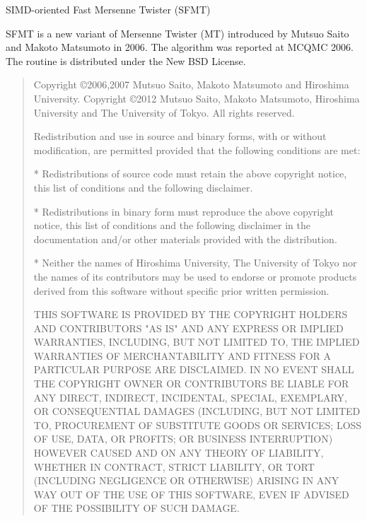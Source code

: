 \documentclass[a4paper,11pt,oneside,english]{sphinxmanual}
\begin{document}
\vspace{1ex}

{\large SIMD-oriented Fast Mersenne Twister (SFMT)}

SFMT is a new variant of Mersenne Twister (MT) introduced by Mutsuo Saito and Makoto Matsumoto in 2006. The algorithm was reported at MCQMC 2006.
The routine is distributed under the New BSD License.

\begin{quote}
  Copyright \copyright 2006,2007 Mutsuo Saito, Makoto Matsumoto and Hiroshima University.
  Copyright \copyright 2012 Mutsuo Saito, Makoto Matsumoto, Hiroshima University and The University of Tokyo.
  All rights reserved.

  Redistribution and use in source and binary forms, with or without modification, are permitted provided that the following conditions are met:

  * Redistributions of source code must retain the above copyright
  notice, this list of conditions and the following disclaimer.

  * Redistributions in binary form must reproduce the above
  copyright notice, this list of conditions and the following
  disclaimer in the documentation and/or other materials provided
  with the distribution.

  * Neither the names of Hiroshima University, The University of
  Tokyo nor the names of its contributors may be used to endorse
  or promote products derived from this software without specific
  prior written permission.

  THIS SOFTWARE IS PROVIDED BY THE COPYRIGHT HOLDERS AND CONTRIBUTORS
  "AS IS" AND ANY EXPRESS OR IMPLIED WARRANTIES, INCLUDING, BUT NOT
  LIMITED TO, THE IMPLIED WARRANTIES OF MERCHANTABILITY AND FITNESS FOR
  A PARTICULAR PURPOSE ARE DISCLAIMED. IN NO EVENT SHALL THE COPYRIGHT
  OWNER OR CONTRIBUTORS BE LIABLE FOR ANY DIRECT, INDIRECT, INCIDENTAL,
  SPECIAL, EXEMPLARY, OR CONSEQUENTIAL DAMAGES (INCLUDING, BUT NOT
  LIMITED TO, PROCUREMENT OF SUBSTITUTE GOODS OR SERVICES; LOSS OF USE,
  DATA, OR PROFITS; OR BUSINESS INTERRUPTION) HOWEVER CAUSED AND ON ANY
  THEORY OF LIABILITY, WHETHER IN CONTRACT, STRICT LIABILITY, OR TORT
  (INCLUDING NEGLIGENCE OR OTHERWISE) ARISING IN ANY WAY OUT OF THE USE
  OF THIS SOFTWARE, EVEN IF ADVISED OF THE POSSIBILITY OF SUCH DAMAGE.
\end{quote}
\end{document}
